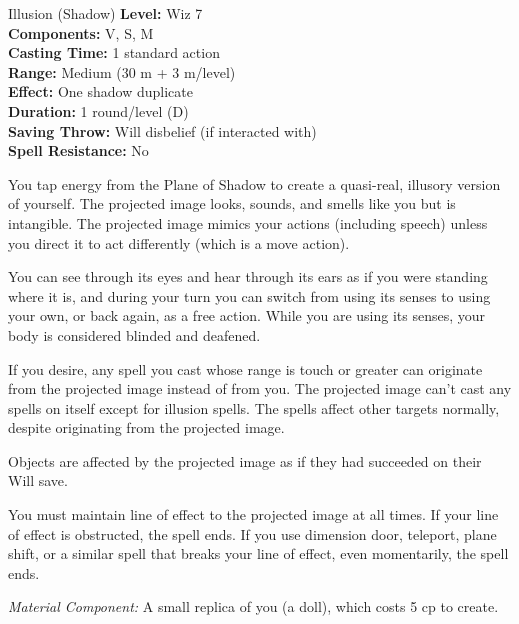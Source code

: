 {Illusion (Shadow)}
{
	\textbf{Level:}
	Wiz 7\\
	\textbf{Components:}
	V, S, M\\
	\textbf{Casting Time:}
	1 standard action\\
	\textbf{Range:}
	Medium (30 m + 3 m/level)\\
	\textbf{Effect:}
	One shadow duplicate\\
	\textbf{Duration:}
	1 round/level (D)\\
	\textbf{Saving Throw:}
	Will disbelief (if interacted with)\\
	\textbf{Spell Resistance:}
	No\\
}
{
	You tap energy from the Plane of Shadow to create a quasi-real, illusory version of yourself. The projected image looks, sounds, and smells like you but is intangible. The projected image mimics your actions (including speech) unless you direct it to act differently (which is a move action).

	You can see through its eyes and hear through its ears as if you were standing where it is, and during your turn you can switch from using its senses to using your own, or back again, as a free action. While you are using its senses, your body is considered blinded and deafened.

	If you desire, any spell you cast whose range is touch or greater can originate from the projected image instead of from you. The projected image can't cast any spells on itself except for illusion spells. The spells affect other targets normally, despite originating from the projected image.

	Objects are affected by the projected image as if they had succeeded on their Will save.

	You must maintain line of effect to the projected image at all times. If your line of effect is obstructed, the spell ends. If you use dimension door, teleport, plane shift, or a similar spell that breaks your line of effect, even momentarily, the spell ends.

	\textit{Material Component:}
	A small replica of you (a doll), which costs 5 cp to create.

}
